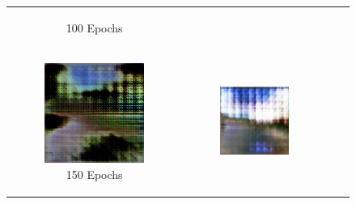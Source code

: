 \documentclass{article}
\begin{document}
\begin{figure}[H]
\begin{tabular}{cccc}
\begin{subfigure}{0.23\textwidth}
            \caption{100 Epochs}
        \end{subfigure} \\
        \begin{subfigure}{0.23\textwidth}
            \centering
            \includegraphics[width=\linewidth]{world_epoch_150_11.png}
            \caption{150 Epochs}
        \end{subfigure} &
        \begin{subfigure}{0.23\textwidth}
            \centering
            \includegraphics[width=\linewidth]{world_epoch_200_11.png}

\end{subfigure}
\end{tabular}
\end{figure}
\end{document}
